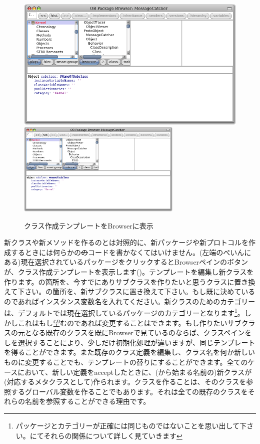\documentclass[a4paper,10pt,twoside]{book}
\begin{document}
\begin{figure}[htbp]
   \centering
   \ifluluelse
	   {\includegraphics[width=\textwidth]{SystemBrowserClassCreation}}
	   {\includegraphics[width=0.7\textwidth]{SystemBrowserClassCreation}}
   \caption{クラス作成テンプレートをBrowserに表示
   }
\end{figure}

新クラスや新メソッドを作るのとは対照的に、新パッケージや新プロトコルを作成するときには何らかの\st のコードを書かなくてはいけません。(左端のぺいんにある)現在選択されているパッケージをクリックするとBrowserペインのボタンが、クラス作成テンプレートを表示します()。テンプレートを編集し新クラスを作ります。の箇所を、今すでにありサブクラスを作りたいと思うクラスに置き換えて下さい。の箇所を、新サブクラスに置き換えて下さい。もし既に決めているのであればインスタンス変数名を入れてください。新クラスのためのカテゴリーは、デフォルトでは現在選択しているパッケージのカテゴリーとなります\footnote{パッケージとカテゴリーが正確には同じものではないことを思い出して下さい。にてそれらの関係について詳しく見ていきます}。しかしこれはもし望むのであれば変更することはできます。もし作りたいサブクラスの元となる既存のクラスを既にBrowserで見ているのならば、クラスペインを\actclick しを選択することにより、少しだけ初期化処理が違いますが、同じテンプレートを得ることができます。また既存のクラス定義を編集し、クラス名を何か新しいものに変更することでも、テンプレートの替りにすることができます。全てのケースにおいて、新しい定義をacceptしたときに、(\ct{#}から始まる名前の)新クラスが(対応するメタクラスとして)作られます。クラスを作ることは、そのクラスを参照するグローバル変数を作ることでもあります。それは全ての既存のクラスをそれらの名前を参照することができる理由です。
\end{document}
